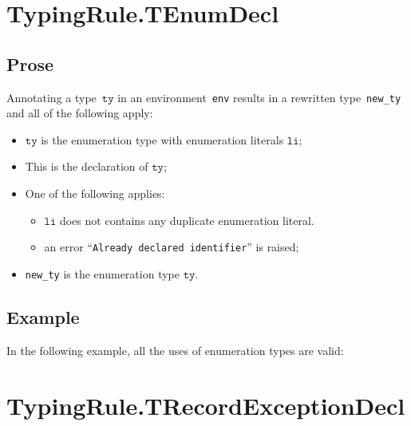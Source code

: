 \documentclass{book}
\newcommand\tty[0]{\texttt{ty}}
\newcommand\vli[0]{\texttt{li}}
\begin{document}
\begin{itemize}
\section{TypingRule.TEnumDecl \label{sec:TypingRule.TEnumDecl}}

\subsection{Prose}
Annotating a type~$\tty$ in an environment~\texttt{env} results in a
rewritten type~\texttt{new\_ty} and all of the following apply:
\begin{itemize}
  \item $\tty$ is the enumeration type with enumeration literals
    $\vli$;
  \item This is the declaration of $\tty$;
  \item One of the following applies:
    \begin{itemize}
      \item $\vli$ does not contains any duplicate enumeration literal.
      \item an error ``\texttt{Already declared identifier}'' is raised;
    \end{itemize}
  \item \texttt{new\_ty} is the enumeration type $\tty$.
\end{itemize}

\subsection{Example}
In the following example, all the uses of enumeration types are valid:







\section{TypingRule.TRecordExceptionDecl \label{sec:TypingRule.TRecordExceptionDecl}}


\end{itemize}
\end{document}
